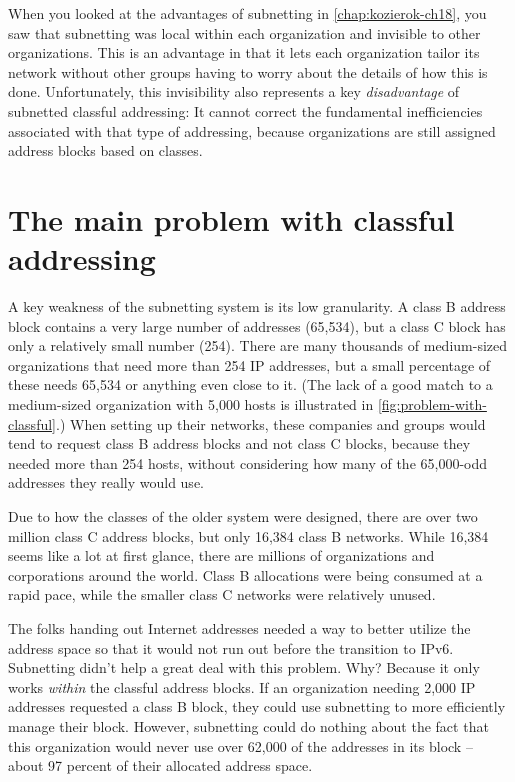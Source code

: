 When you looked at the advantages of subnetting in
\cref{chap:kozierok-ch18}, you saw that subnetting was
local within each organization and invisible to other organizations.
This is an advantage in that it lets each organization tailor its
network without other groups having to worry about the details of how
this is done. Unfortunately, this invisibility also represents a key
{\emph{disadvantage}} of subnetted classful addressing: It cannot
correct the fundamental inefficiencies associated with that type of
addressing, because organizations are still assigned address blocks
based on classes.



\section{The main problem with classful addressing}

A key weakness of the subnetting system is its low
granularity. A
class B address block contains a very large number of addresses
(65,534), but a class C block has only a relatively small number (254).
There are many thousands of medium-sized organizations that need more
than 254 IP addresses, but a small percentage of these needs 65,534 or
anything even close to it. (The lack of a good match to a medium-sized
organization with 5,000 hosts is illustrated in \vref{fig:problem-with-classful}.)
When setting up their networks, these companies and groups would tend to request class B
address blocks and not class C blocks, because they needed more than 254
hosts, without considering how many of the 65,000-odd addresses they
really would use.

Due to how the classes of the older system were designed, there are over
two million class C address blocks, but only 16,384 class B networks.
While 16,384 seems like a lot at first glance, there are millions of
organizations and corporations around the world.
Class B allocations were being consumed at a rapid pace, while the smaller class C networks were relatively unused.

The folks handing out Internet addresses needed a way to better utilize
the address space so that it would not run out before the transition to
IPv6. Subnetting didn't help a great deal with this problem. Why?
Because it only works {\emph{within}} the classful address blocks. If an
organization needing 2,000 IP addresses requested a class B block, they
could use subnetting to more efficiently manage their block. However,
subnetting could do nothing about the fact that this organization would
never use over 62,000 of the addresses in its block -- about 97 percent
of their allocated address space.

